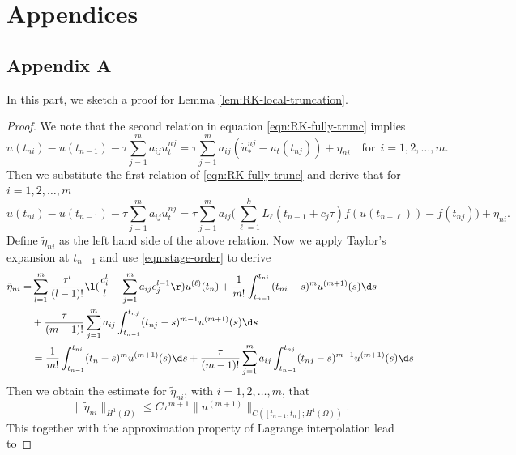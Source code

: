 \chapter{Appendices}

\section*{Appendix A}\label{sec:appendixA}
In this part, we sketch a proof for Lemma \ref{lem:RK-local-truncation}.
\begin{proof}
We note that the second relation in equation \eqref{eqn:RK-fully-trunc} implies
\begin{equation*}
 u(t_{ni}) -   u(t_{n-1}) -\tau\sum_{j=1}^m a_{ij}  u_t^{nj} =
 \tau \sum_{j=1}^m a_{ij} (\dot u_*^{nj} - u_t(t_{nj}))+
 \eta_{ni}\quad \text{for} ~~i=1,2,\dots,m.
\end{equation*}
Then we substitute the first relation of \eqref{eqn:RK-fully-trunc} and derive that
for $i=1,2,\dots,m$
\begin{equation*}
 u(t_{ni}) -   u(t_{n-1}) -\tau\sum_{j=1}^m a_{ij}  u_t^{nj} =
 \tau \sum_{j=1}^m a_{ij}   \Big(\sum_{\ell=1}^k L_{\ell}(t_{n-1}+c_j\tau) f(u(t_{n-\ell})) - f(t_{nj})\Big)+
 \eta_{ni}.
\end{equation*}
Define $\tilde\eta_{ni}$ as the left hand side of the above relation. %
Now we apply Taylor's expansion at $t_{n-1}$  and use \eqref{eqn:stage-order} to derive
\begin{equation*}
\begin{aligned}
\tilde\eta_{ni} =& \sum_{l=1}^{m}\frac{\tau^l}{(l-1)!}\l(\frac{c_i^l}l -
\sum_{j=1}^ma_{ij}c_j^{l-1}\r)u^{(\ell)}(t_n) +
\frac1{m!}\int_{t_{n-1}}^{t_{ni}} (t_{ni}-s)^{m} u^{(m+1)}(s) \d s \\
&+ \frac\tau{(m-1)!}\sum_{j=1}^ma_{ij}\int_{t_{n-1}}^{t_{nj}}
(t_{nj}-s)^{m-1} u^{(m+1)}(s) \d s\\
&=\frac1{m!}\int_{t_{n-1}}^{t_{ni}} (t_n-s)^{m} u^{(m+1)}(s) \d s
+ \frac\tau{(m-1)!}\sum_{j=1}^ma_{ij}\int_{t_{n-1}}^{t_{nj}}
(t_{nj}-s)^{m-1} u^{(m+1)}(s) \d s
\end{aligned}
\end{equation*}
Then we obtain the estimate for $\tilde\eta_{ni}$, with $i=1,2,\dots,m$, that
\begin{equation*}
\|\tilde\eta_{ni}\|_{H^1(\Omega)} \leq C\tau^{m+1} \|u^{(m+1)}\|_{C([t_{n-1},t_n];H^1(\Omega))}.
\end{equation*}
This together with the approximation property of Lagrange interpolation lead to

\end{proof}
